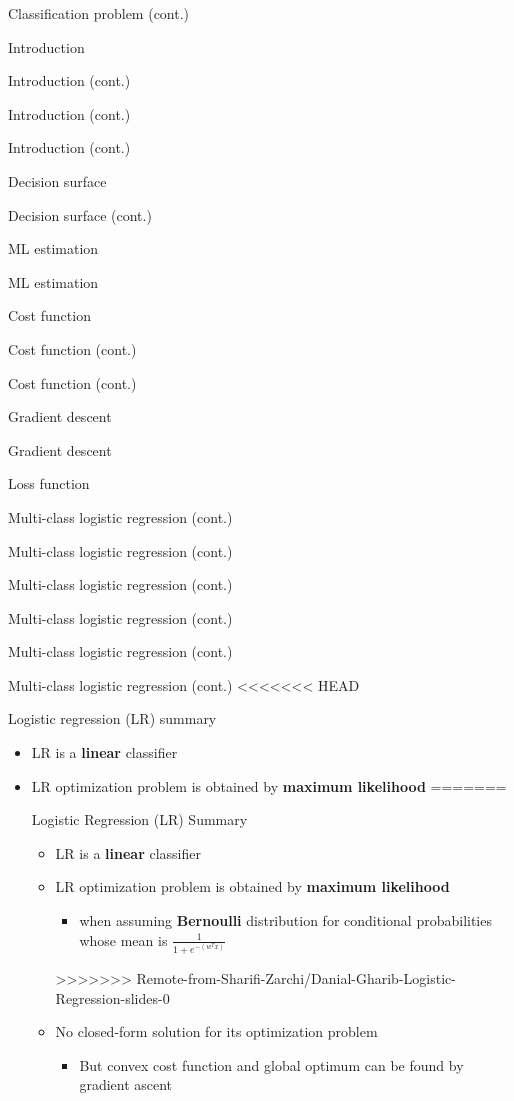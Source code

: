 \documentclass[serif, aspectratio=169]{beamer}
\begin{document}
\begin{frame}{Classification problem (cont.)}
\begin{itemize}
\begin{frame}{Introduction}
\begin{itemize}
\begin{frame}{Introduction (cont.)}
\begin{frame}{Introduction (cont.)}
\begin{frame}{Introduction (cont.)}
\begin{frame}{Decision surface}
\begin{itemize}
\begin{frame}{Decision surface (cont.)}
\begin{frame}{ML estimation}
\begin{frame}{ML estimation}
\begin{itemize}
\begin{frame}{Cost function}
\begin{frame}{Cost function (cont.)}
\begin{itemize}
\begin{itemize}
\begin{frame}{Cost function (cont.)}
\begin{frame}{Gradient descent}
\begin{frame}{Gradient descent}
\begin{frame}{Loss function}
\begin{frame}{Multi-class logistic regression (cont.)}
\begin{frame}{Multi-class logistic regression (cont.)}
\begin{frame}{Multi-class logistic regression (cont.)}
\begin{frame}{Multi-class logistic regression (cont.)}
\begin{frame}{Multi-class logistic regression (cont.)}
\begin{frame}{Multi-class logistic regression (cont.)}
<<<<<<< HEAD
\begin{frame}{Logistic regression (LR) summary}
    \begin{itemize}
        \item LR is a \textbf{linear} classifier
        \item LR optimization problem is obtained by \textbf{maximum likelihood}
=======
\begin{frame}{Logistic Regression (LR) Summary}
    \begin{itemize}
        \item LR is a \textbf{linear} classifier
        \item LR optimization problem is obtained by \textbf{maximum likelihood}
            \begin{itemize}
                \item when assuming \textbf{Bernoulli} distribution for conditional probabilities whose mean is $\frac{1}{1 + e^{-(w^Tx)}}$
            \end{itemize}
>>>>>>> Remote-from-Sharifi-Zarchi/Danial-Gharib-Logistic-Regression-slides-0
        \item No closed-form solution for its optimization problem
            \begin{itemize}
                \item But convex cost function and global optimum can be found by gradient ascent
            \end{itemize}
    \end{itemize}
\end{frame}



\end{itemize}
\end{frame}
\end{frame}
\end{frame}
\end{frame}
\end{frame}
\end{frame}
\end{frame}
\end{frame}
\end{frame}
\end{frame}
\end{frame}
\end{itemize}
\end{itemize}
\end{frame}
\end{frame}
\end{itemize}
\end{frame}
\end{frame}
\end{frame}
\end{itemize}
\end{frame}
\end{frame}
\end{frame}
\end{frame}
\end{itemize}
\end{frame}
\end{itemize}
\end{frame}
\end{document}
